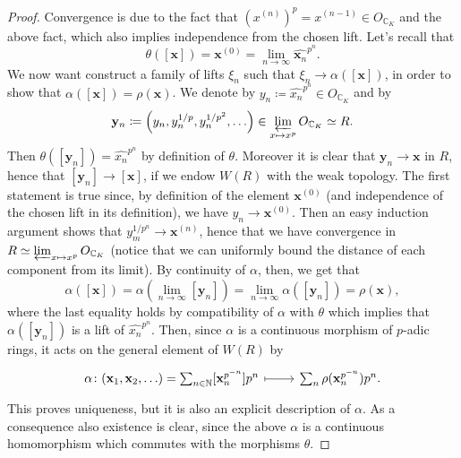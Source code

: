 \begin{proof}
	Convergence is due to the fact that $(x^{(n)})^p = x^{(n-1)} \in O_{\mathbb{C}_K}$
	and the above fact, which also implies independence from the chosen lift.
	Let's recall that
	\begin{equation*}
	\theta([\mathbf{x}]) = \mathbf{x}^{(0)} =
	\lim_{n \to \infty} \widehat{\mathbf{x}_n}^{p^n}
	.\end{equation*}
	We now want construct a family of lifts
	$\xi_n$ such that $\xi_n \to \alpha([\mathbf{x}])$, in order
	to show that $\alpha([\mathbf{x}]) = \rho(\mathbf{x})$.
	We denote by $y_n \coloneqq \widehat{x_n}^{p^n} \in O_{\mathbb{C}_K}$
	and by
	\begin{equation*}
		\mathbf{y}_n \coloneqq \left( y_n, y_n^{1/p}, y_n^{1/p^2}, \ldots \right) \in 
		\varprojlim_{x \mapsto x^p} O_{\mathbb{C}_K} \simeq R
	.\end{equation*}
	Then $\theta([\mathbf{y}_n]) = \widehat{x_n}^{p^n}$ by definition of $\theta$.
	Moreover it is clear that $\mathbf{y}_n \to \mathbf{x}$ in $R$,
	hence that $[\mathbf{y}_n] \to [\mathbf{x}]$, if we endow $W(R)$ with the weak topology.
	The first statement is true since, by definition of the element $\mathbf{x}^{(0)}$
	(and independence of the chosen lift in its definition), we have
	$y_n \to \mathbf{x}^{(0)}$. Then an easy induction argument
	shows that $y_m^{1/p^n} \to \mathbf{x}^{(n)}$, hence that we have convergence
	in $R \simeq \varprojlim_{x \mapsto x^p}O_{\mathbb{C}_K}$ (notice that we
	can uniformly bound the distance of each component from its limit).
	By continuity of $\alpha$, then, we get that
	\begin{equation*}
		\alpha([\mathbf{x}]) = \alpha\left(\lim_{n \to \infty} [\mathbf{y}_n]\right) =
		\lim_{n \to \infty} \alpha([\mathbf{y}_n]) = \rho(\mathbf{x})
	,\end{equation*}
	where the last equality holds by compatibility of $\alpha$ with $\theta$
	which implies that $\alpha([\mathbf{y}_n])$ is a lift of $\widehat{x_n}^{p^n}$.
	Then, since $\alpha$ is a continuous morphism of $p$-adic rings,
	it acts on the general element of $W(R)$ by
	\begin{equation*}
	\begin{tikzcd}[row sep = 0ex
		,/tikz/column 1/.append style={anchor=base east}
		,/tikz/column 2/.append style={anchor=base west}]
		\alpha\colon 
		(\mathbf{x}_1, \mathbf{x}_2, \ldots) =
		\sum_{n \in \mathbb{N} }^{  } [\mathbf{x}_n^{p^{-n}}] p^n
		\arrow[r, "", mapsto] &
		\sum_{n }^{  } \rho (\mathbf{x}_n^{p^{-n}}) p^n
	.\end{tikzcd}
	\end{equation*} 
	This proves uniqueness, but it is also an explicit description of $\alpha$.
	As a consequence also existence is clear, since the above $\alpha$ is
	a continuous homomorphism which commutes with the morphisms $\theta$.
\end{proof}
